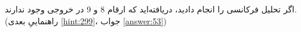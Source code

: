 \section{}
\paragraph{}\label{hint:341}
اگر تحلیل فرکانسی را انجام دادید، دریافته‌اید که ارقام 8 و 9 در خروجی وجود ندارند. (راهنماییِ بعدی \ref{hint:299}، جواب \ref{answer:53})